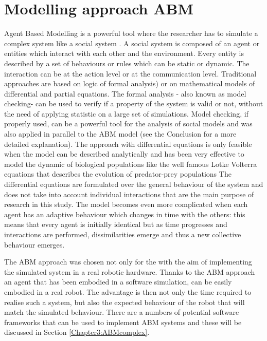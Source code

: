 \section{Modelling approach ABM}
Agent Based Modelling is a powerful tool where the researcher has to simulate a complex
system like a social system \citep{WMacyWiller2002:SocialABM}.
A social system is composed of an agent or entities which interact with each
other and the environment.
Every entity is described by a set of behaviours or rules which can be static
or dynamic.
The interaction can be at the action level or at the communication level.
Traditional approaches are based on logic of formal analysis) or on
mathematical models of differential and partial equations.
The formal analysis - also known as model checking- can be used to verify if a
property of the system is valid or not, without the need of applying statistic
on a large set of simulations.
Model checking, if properly used, can be a powerful tool for the analysis of
social models and was also applied in parallel to the ABM model (see the Conclusion
for a more detailed explanation).
The approach with differential equations is only feasible when the model can 
be described analytically and has been very effective to model the dynamic of biological
populations like the well famous Lotke Volterra equations \citep{LotkeVolterra1931:PredatorPrey} that describes the
 evolution of predator-prey populations 
The differential equations are formulated over the general behaviour of the system
 and does not take into account individual interactions that are the main 
purpose of research in this study.
The model becomes even more complicated when each agent has an adaptive
behaviour which changes in time with the others: this means that every
agent is initially identical but as time progresses and interactions are
performed, dissimilarities emerge and thus a new collective behaviour emerges.

The ABM approach was chosen not only for the with the aim of implementing the simulated system
 in a real robotic hardware.
Thanks to the ABM approach an agent that has been embodied in a software simulation,
 can be easily embodied in a real robot.
The advantage is then not only the time required to realise such a system,
but also the expected behaviour of the robot that will match the simulated behaviour.
There are a numbers of potential software frameworks that can be used to
implement ABM systems and these will be discussed in Section
\ref{Chapter3:ABMcomplex}.

